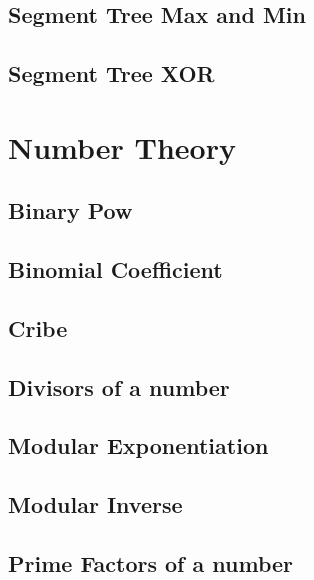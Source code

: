 \documentclass[twocolumn]{article}
\begin{document}
\subsection{Segment Tree Max and Min}
\raggedbottom
\hrulefill
\subsection{Segment Tree XOR}
\raggedbottom
\hrulefill

\section{Number Theory}
\subsection{Binary Pow}
\raggedbottom
\hrulefill
\subsection{Binomial Coefficient}
\raggedbottom
\hrulefill
\subsection{Cribe}
\raggedbottom
\hrulefill
\subsection{Divisors of a number}
\raggedbottom
\hrulefill
\subsection{Modular Exponentiation}
\raggedbottom
\hrulefill
\subsection{Modular Inverse}
\raggedbottom
\hrulefill
\subsection{Prime Factors of a number}
\raggedbottom
\hrulefill
\end{document}
